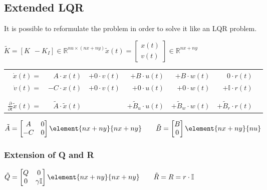 \documentclass[10pt,a4paper]{scrartcl}
\begin{document}
\begin{multicols*}{3}
	
	
	\subsection*{Extended LQR}
	
	It is possible to reformulate the problem in order to solve it like an LQR problem.
	
	
	$\tilde{K}=[K\ \ -K_I]\in\mathbb{R}^{nu\times (nx+ny)}$\hfill$\tilde{x}(t)=\begin{bmatrix}x(t)\\v(t)\end{bmatrix}\in\mathbb{R}^{nx+ny}$
	
	\scriptsize		
	\begin{tabular}{rrrrrrr}
	$\dot{x}(t)=$&$A\cdot x(t)$&$+0\cdot v(t)$&$+B\cdot u(t)$&$+B\cdot w(t)$&$0\cdot r(t)$\\
	$\dot{v}(t)=$&$-C\cdot x(t)$&$+0\cdot v(t)$&$+ 0\cdot u(t)$&$ + 0\cdot w(t)$&$ + \mathbb{I}\cdot r(t)$&$
	$\\
	\vspace{-2ex}\\
	\hline
	\vspace{-2ex}\\
	$\frac{\partial}{\partial t}\tilde{x}(t)=$&$\tilde{A}\cdot \tilde{x}(t)$&&$+\tilde{B}_u\cdot u(t)$&$+\tilde{B}_w\cdot w(t)$&$+\tilde{B}_r\cdot r(t)$	
	\end{tabular}
	\normalsize
	
	\finn
	
	
	$\tilde{A}=\begin{bmatrix}A&0\\-C&0\end{bmatrix}\element{nx+ny}{nx+ny}\qquad\tilde{B}=\begin{bmatrix}B\\0\end{bmatrix}\element{nx+ny}{nu}$
	
	\subsubsection{Extension of Q and R}
	
	$\tilde{Q}=\begin{bmatrix}Q&0\\0&\gamma\mathbb{I}\end{bmatrix}\element{nx+ny}{nx+ny}\qquad\tilde{R}=R=r\cdot \mathbb{I}$
	

\end{multicols*}
\end{document}
